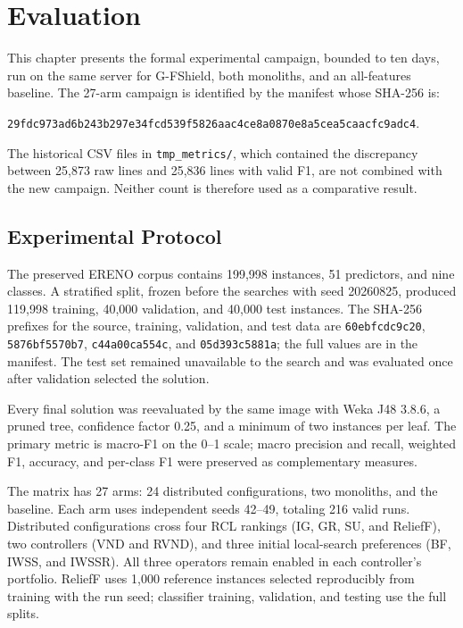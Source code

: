 \chapter{Evaluation}
\label{chapter:avaliacao}

This chapter presents the formal experimental campaign, bounded to ten days, run on the same server for G-FShield, both monoliths, and an all-features baseline. The 27-arm campaign is identified by the manifest whose SHA-256 is:
\begin{center}
\small\texttt{29fdc973ad6b243b297e34fcd539f5826aac4ce8a0870e8a5cea5caacfc9adc4}.
\end{center}
The historical CSV files in \texttt{tmp\_metrics/}, which contained the discrepancy between 25,873 raw lines and 25,836 lines with valid F1, are not combined with the new campaign. Neither count is therefore used as a comparative result.

\section{Experimental Protocol}

The preserved ERENO corpus contains 199,998 instances, 51 predictors, and nine classes. A stratified split, frozen before the searches with seed 20260825, produced 119,998 training, 40,000 validation, and 40,000 test instances. The SHA-256 prefixes for the source, training, validation, and test data are \texttt{60ebfcdc9c20}, \texttt{5876bf5570b7}, \texttt{c44a00ca554c}, and \texttt{05d393c5881a}; the full values are in the manifest. The test set remained unavailable to the search and was evaluated once after validation selected the solution.

Every final solution was reevaluated by the same image with Weka J48 3.8.6, a pruned tree, confidence factor 0.25, and a minimum of two instances per leaf. The primary metric is macro-F1 on the 0--1 scale; macro precision and recall, weighted F1, accuracy, and per-class F1 were preserved as complementary measures.

The matrix has 27 arms: 24 distributed configurations, two monoliths, and the baseline. Each arm uses independent seeds 42--49, totaling 216 valid runs. Distributed configurations cross four RCL rankings (IG, GR, SU, and ReliefF), two controllers (VND and RVND), and three initial local-search preferences (BF, IWSS, and IWSSR). All three operators remain enabled in each controller's portfolio. ReliefF uses 1,000 reference instances selected reproducibly from training with the run seed; classifier training, validation, and testing use the full splits.

